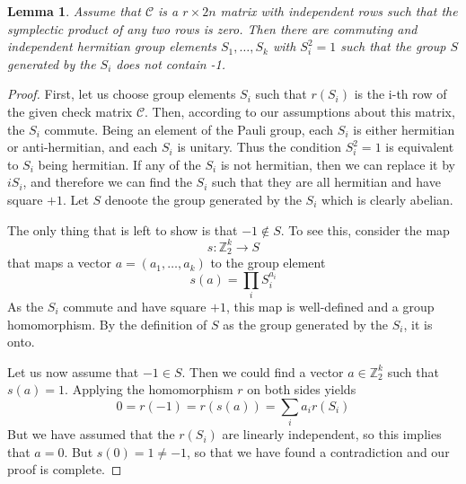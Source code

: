 \documentclass[a4paper, draft]{article}
\theoremstyle{own}
\newtheorem{lem}[thm]{Lemma}
\theoremstyle{remark}
\newcommand{\Z}{\mathbb{Z}}
\begin{document}
\begin{lem}
Assume that $\mathcal{C}$ is a $r \times 2n$ matrix with independent rows such that the symplectic product of any two rows is zero. Then there are commuting and independent hermitian group elements $S_1, \dots, S_k$ with $S_i^2 = 1$ such that the group $S$ generated by the $S_i$ does not contain -1.
\end{lem}


\begin{proof}
First, let us choose group elements $S_i$ such that $r(S_i)$ is the i-th row of the given check matrix $\mathcal{C}$. Then, according to our assumptions about this matrix, the $S_i$ commute. Being an element of the Pauli group, each $S_i$ is either hermitian or anti-hermitian, and each $S_i$ is unitary. Thus the condition $S_i^2 = 1$ is equivalent to $S_i$ being hermitian. If any of the $S_i$ is not hermitian, then we can replace it by $i S_i$, and therefore we can find the $S_i$ such that they are all hermitian and have square $+1$. Let $S$ denoote the group generated by the $S_i$ which is clearly abelian.

The only thing that is left to show is that $-1 \notin S$. To see this, consider the map
$$
s \colon \Z_2^k \rightarrow S
$$
that maps a vector $a = (a_1, \dots, a_k)$ to the group element 
$$
s(a) = \prod_i S_i^{a_i}
$$
As the $S_i$ commute and have square $+1$, this map is well-defined and a group homomorphism. By the definition of $S$ as the group generated by the $S_i$, it is onto. 

Let us now assume that $-1 \in S$. Then we could find a vector $a \in \Z_2^k$ such that $s(a) = 1$. Applying the homomorphism $r$ on both sides yields
$$
0 = r(-1) = r(s(a)) = \sum_i a_i r(S_i)
$$
But we have assumed that the $r(S_i)$ are linearly independent, so this implies that $a = 0$. But $s(0) = 1 \neq -1$, so that we have found a contradiction and our proof is complete.
\end{proof}

\end{document}
